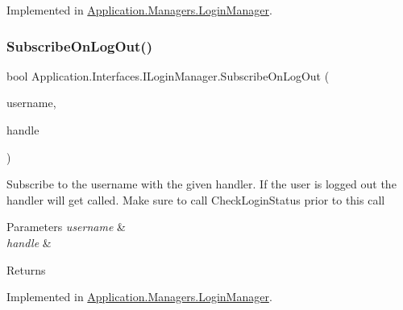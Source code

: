 Implemented in \mbox{\hyperlink{class_application_1_1_managers_1_1_login_manager_a561516fbf8f97f695efdb1cb696899e8}{Application.\+Managers.\+Login\+Manager}}.

\mbox{\label{interface_application_1_1_interfaces_1_1_i_login_manager_a81fc028c701e8e372d635d6bd9664570}} 
\subsubsection{\texorpdfstring{Subscribe\+On\+Log\+Out()}{SubscribeOnLogOut()}}
{\footnotesize\ttfamily bool Application.\+Interfaces.\+I\+Login\+Manager.\+Subscribe\+On\+Log\+Out (\begin{DoxyParamCaption}\item[{string}]{username,  }\item[{\mbox{\hyperlink{namespace_application_1_1_interfaces_a3ba96a057acca29f3e2e533aeb2f30e0}{User\+Logged\+Out\+Handle}}}]{handle }\end{DoxyParamCaption})}



Subscribe to the username with the given handler. If the user is logged out the handler will get called. Make sure to call Check\+Login\+Status prior to this call 


\begin{DoxyParams}{Parameters}
{\em username} & \\
\hline
{\em handle} & \\
\hline
\end{DoxyParams}
\begin{DoxyReturn}{Returns}

\end{DoxyReturn}


Implemented in \mbox{\hyperlink{class_application_1_1_managers_1_1_login_manager_a9502ab9e9e8d04a42a9c3cdf451b405b}{Application.\+Managers.\+Login\+Manager}}.

\mbox{\label{interface_application_1_1_interfaces_1_1_i_login_manager_aeb60a7935fa777e629db6098ce2f458d}} 
